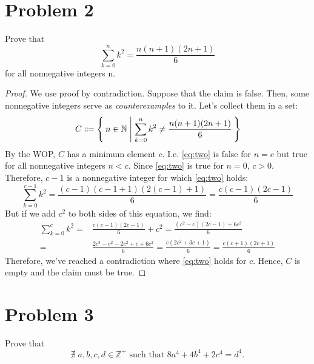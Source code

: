 \documentclass{article}
\begin{document}
\pagebreak

\section{Problem 2}
Prove that
\begin{equation}\label{eq:two}
	\sum_{k=0}^n k^2 = \frac{n(n+1)(2n+1)}{6}
\end{equation}
for all nonnegative integers n.
\begin{proof}
	We use proof by contradiction. Suppose that the claim is false. Then, some nonnegative integers serve as \textit{counterexamples} to it. Let's collect them in a set:
	\[
		C \Coloneqq \Set{n \in \mathbb{N} | \sum_{k=0}^n k^2 \neq \frac{n(n+1)(2n+1)}{6}}
	\]
	By the WOP, $C$ has a minimum element $c$. I.e. \eqref{eq:two} is false for $n = c$ but true for all nonnegative integers $n < c$. Since \eqref{eq:two} is true for $n = 0$, $c > 0$.  Therefore, $c - 1$ is a nonnegative integer for which \eqref{eq:two} holds:
	\[
		\sum_{k=0}^{c-1} k^2 = \frac{(c-1)(c-1+1)(2(c-1)+1)}{6} = \frac{c(c-1)(2c-1)}{6}
	\]
	But if we add $c^2$ to both sides of this equation, we find:
	\begin{align*}
		\sum_{k=0}^c k^2 = & \frac{c(c-1)(2c-1)}{6} + c^2 = \frac{(c^2-c)(2c-1)+6c^2}{6} \\ =& \frac{2c^3 - c^2 - 2c^2 + c + 6c^2}{6} = \frac{c(2c^2+3c+1)}{6} = \frac{c(c+1)(2c+1)}{6}
	\end{align*}
	Therefore, we've reached a contradiction where \eqref{eq:two} holds for $c$. Hence, $C$ is empty and the claim must be true.
\end{proof}

\pagebreak

\section{Problem 3}
Prove that
\begin{equation}\label{p9claim}
	\nexists \; a, b, c, d \in \mathbb{Z^+} \text{ such that } 8a^4 + 4b^4 + 2c^4 = d^4.
\end{equation}
\end{document}

